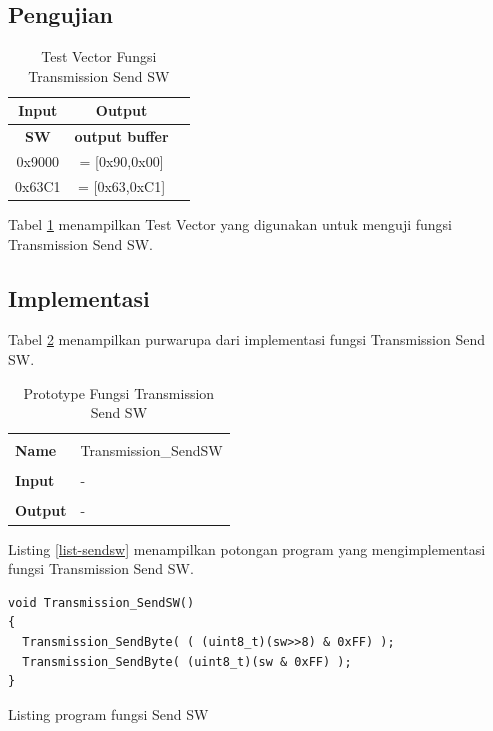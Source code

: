 \subsection {Pengujian}

\begin{table}[h]
  \centering
  \begin{tabular}{ | c | c || c | }
    \hline
    {\bf{Input}}  & \bf{Output} \\
    \hline
    \bf{SW} & \bf{output buffer}\\
    \hline
    0x9000 & = [0x90,0x00] \\
    0x63C1 & = [0x63,0xC1] \\
    \hline
  \end{tabular}
  \caption{Test Vector Fungsi Transmission Send SW}
  \label{tabel-test-sendsw}
\end{table}

Tabel \ref{tabel-test-sendsw} menampilkan Test Vector yang digunakan untuk menguji fungsi Transmission Send SW.

\subsection {Implementasi}

Tabel \ref{tabel-sendsw} menampilkan purwarupa dari implementasi fungsi Transmission Send SW. 

\begin{table}[!h]
  \centering
  \begin{tabular}{p{2cm} p{8cm}}
    \hline\\
    {\bf Name} & Transmission\_SendSW\\
    \hline\\
    {\bf Input} & -
    \\
    \hline\\
    {\bf Output} & -
    \\
    \hline
  \end{tabular}
  \caption{Prototype Fungsi Transmission Send SW}
  \label{tabel-sendsw}
\end{table}

Listing \ref{list-sendsw} menampilkan potongan program yang mengimplementasi fungsi Transmission Send SW.

\begin{lstlisting}
void Transmission_SendSW()
{
  Transmission_SendByte( ( (uint8_t)(sw>>8) & 0xFF) );
  Transmission_SendByte( (uint8_t)(sw & 0xFF) );
}
\end{lstlisting}
\caption{Listing program fungsi Send SW}
\label{list-sendsw}
